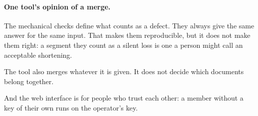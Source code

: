 \paragraph{One tool's opinion of a merge.} The mechanical checks define what counts as a defect. They always give the same answer for the same input. That makes them reproducible, but it does not make them right: a segment they count as a silent loss is one a person might call an acceptable shortening.

The tool also merges whatever it is given. It does not decide which documents belong together.

And the web interface is for people who trust each other: a member without a key of their own runs on the operator's key.
